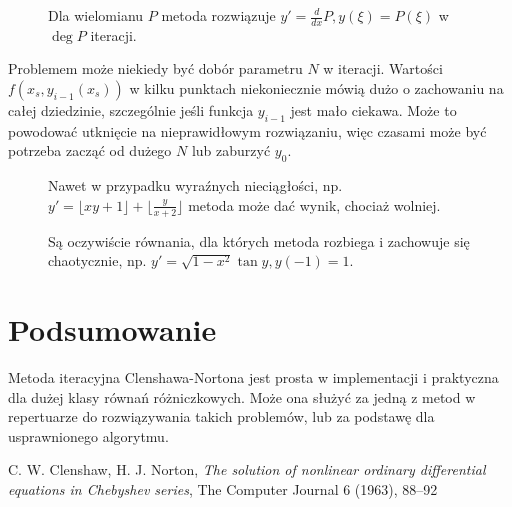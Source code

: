 \documentclass[a4paper, 12pt]{article}
\begin{document}
\begin{figure}
	\centering
	\resizebox{0.9\linewidth}{!}{}
	\caption{Dla wielomianu $P$ metoda rozwiązuje $y' = \frac{d}{dx}P, y(ξ) = P(ξ)$ w $\deg P$ iteracji.}
\end{figure}

Problemem może niekiedy być dobór parametru $N$ w iteracji.
Wartości $f(x_s, y_{i-1}(x_s))$ w kilku punktach niekoniecznie mówią dużo o zachowaniu na całej dziedzinie,
szczególnie jeśli funkcja $y_{i-1}$ jest mało ciekawa.
Może to powodować utknięcie na nieprawidłowym rozwiązaniu,
więc czasami może być potrzeba zacząć od dużego $N$ lub zaburzyć $y_0$.

\begin{figure}
	\centering
	\resizebox{0.9\linewidth}{!}{}
	\caption{Nawet w przypadku wyraźnych nieciągłości, np. $y' = \lfloor xy+1 \rfloor + \lfloor \frac{y}{x+2} \rfloor$ metoda może dać wynik, chociaż wolniej.}
\end{figure}

\begin{figure}
	\centering
	\resizebox{0.9\linewidth}{!}{}
	\caption{Są oczywiście równania, dla których metoda rozbiega i zachowuje się chaotycznie, np. $y' = \sqrt{1-x^2}\tan y, y(-1) = 1$.}
\end{figure}

\section{Podsumowanie}
Metoda iteracyjna Clenshawa-Nortona jest prosta w implementacji i praktyczna
dla dużej klasy równań różniczkowych.
Może ona służyć za jedną z metod w repertuarze do rozwiązywania takich problemów,
lub za podstawę dla usprawnionego algorytmu.

\begin{thebibliography}{1}
		C. W. Clenshaw, H. J. Norton,
		\textit{The solution of nonlinear ordinary differential equations in
			Chebyshev series},
		The Computer Journal 6 (1963), 88--92
\end{thebibliography}
\end{document}
